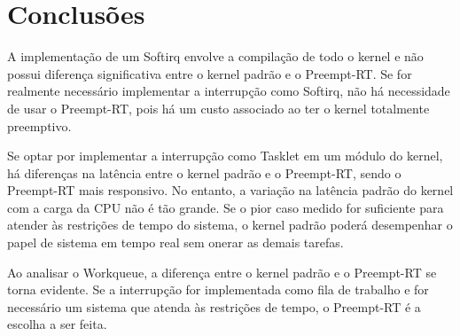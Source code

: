 \section{Conclusões}

A implementação de um Softirq envolve a compilação de todo o kernel e não possui diferença significativa entre o kernel padrão e o Preempt-RT. Se for realmente necessário implementar a interrupção como Softirq, não há necessidade de usar o Preempt-RT, pois há um custo associado ao ter o kernel totalmente preemptivo.

Se optar por implementar a interrupção como Tasklet em um módulo do kernel, há diferenças na latência entre o kernel padrão e o Preempt-RT, sendo o Preempt-RT mais responsivo. No entanto, a variação na latência padrão do kernel com a carga da CPU não é tão grande. Se o pior caso medido for suficiente para atender às restrições de tempo do sistema, o kernel padrão poderá desempenhar o papel de sistema em tempo real sem onerar as demais tarefas.

Ao analisar o Workqueue, a diferença entre o kernel padrão e o Preempt-RT se torna evidente. Se a interrupção for implementada como fila de trabalho e for necessário um sistema que atenda às restrições de tempo, o Preempt-RT é a escolha a ser feita.
